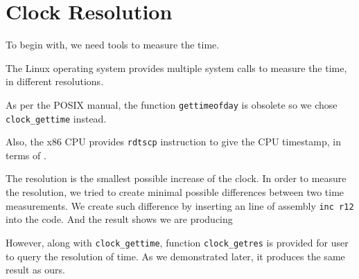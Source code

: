 \section{Clock Resolution}

To begin with, we need tools to measure the time.

The Linux operating system provides multiple system calls to measure the time, in different resolutions.

As per the POSIX manual\cite{posix_clock_gettime}, the function \texttt{gettimeofday} is obsolete so we chose \texttt{clock\_gettime} instead.

Also, the x86 CPU provides \texttt{rdtscp} instruction to give the CPU timestamp, in terms of .

The resolution is the smallest possible increase of the clock. In order to measure the resolution, we tried to create minimal possible differences between two time measurements. We create such difference by inserting an line of assembly \texttt{inc r12} into the code. And the result shows we are producing

However, along with \texttt{clock\_gettime}, function \texttt{clock\_getres} is provided for user to query the resolution of time. As we demonstrated later, it produces the same result as ours.